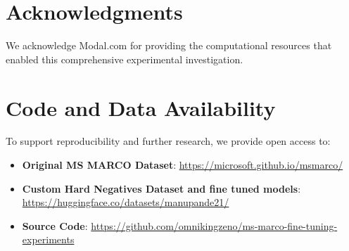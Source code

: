 \documentclass[conference]{IEEEtran}
\begin{document}
\section*{Acknowledgments}
We acknowledge Modal.com \cite{modal2023} for providing the computational resources that enabled this comprehensive experimental investigation.

\section*{Code and Data Availability}
To support reproducibility and further research, we provide open access to:

\begin{itemize}
\item \textbf{Original MS MARCO Dataset}: \url{https://microsoft.github.io/msmarco/}
\item \textbf{Custom Hard Negatives Dataset and fine tuned models}: \url{https://huggingface.co/datasets/manupande21/}
\item \textbf{Source Code}: \url{https://github.com/omnikingzeno/ms-marco-fine-tuning-experiments}
\end{itemize}
\end{document}
